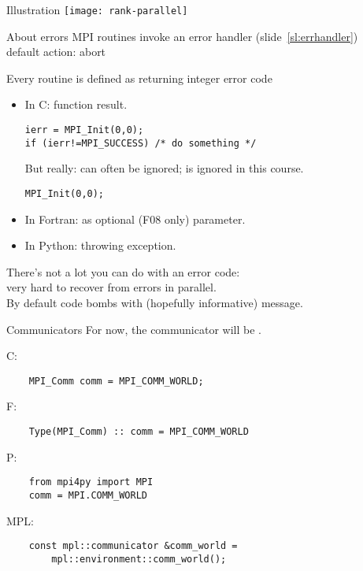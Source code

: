 \begin{exerciseframe}[commrank]
  
\end{exerciseframe}

\begin{numberedframe}{Illustration}
  \texttt{[image: rank-parallel]}
\end{numberedframe}

\begin{numberedframe}{About errors}
  MPI routines invoke an error handler (slide~\ref{sl:errhandler})\\
  default action: abort
  
  Every routine is defined as returning integer error code
  \begin{itemize}
  \item In C: function result. 
\lstset{language=C++}
\begin{lstlisting}
ierr = MPI_Init(0,0);
if (ierr!=MPI_SUCCESS) /* do something */
\end{lstlisting}
  But really: can often be ignored; is ignored in this course.
\begin{lstlisting}
MPI_Init(0,0);
\end{lstlisting}
  \item In Fortran: as optional (F08 only) parameter.
  \item In Python: throwing exception.
  \end{itemize}
  There's not a lot you can do with an error code:\\
  very hard to recover from errors in parallel.\\
  By default code bombs with (hopefully informative) message.
\end{numberedframe}

\begin{numberedframe}{Communicators}
  \label{sl:mpi-comm-world}
  For now, the communicator will be .

  C:
  \lstset{language=C}
  \begin{lstlisting}
    MPI_Comm comm = MPI_COMM_WORLD;
  \end{lstlisting}

  F:
  \lstset{language=Fortran}
  \begin{lstlisting}
    Type(MPI_Comm) :: comm = MPI_COMM_WORLD
  \end{lstlisting}

  P:
  \lstset{language=Python}
  \begin{lstlisting}
    from mpi4py import MPI
    comm = MPI.COMM_WORLD
  \end{lstlisting}

  MPL:
  \lstset{language=C++}
  \begin{lstlisting}
    const mpl::communicator &comm_world =
        mpl::environment::comm_world();
  \end{lstlisting}
\end{numberedframe}


